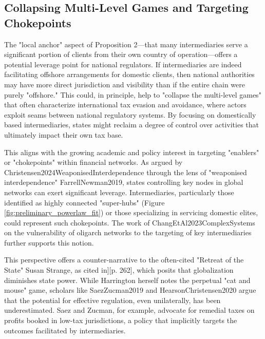 \subsection{Collapsing Multi-Level Games and Targeting Chokepoints}
\label{subsec:collapsing_games_chokepoints}

The "local anchor" aspect of Proposition 2—that many intermediaries serve a significant portion of clients from their own country of operation—offers a potential leverage point for national regulators. If intermediaries are indeed facilitating offshore arrangements for domestic clients, then national authorities may have more direct jurisdiction and visibility than if the entire chain were purely "offshore." This could, in principle, help to "collapse the multi-level games" that often characterize international tax evasion and avoidance, where actors exploit seams between national regulatory systems. By focusing on domestically based intermediaries, states might reclaim a degree of control over activities that ultimately impact their own tax base.

This aligns with the growing academic and policy interest in targeting "enablers" or "chokepoints" within financial networks. As argued by Christensen2024WeaponisedInterdependence through the lens of "weaponised interdependence" FarrellNewman2019, states controlling key nodes in global networks can exert significant leverage. Intermediaries, particularly those identified as highly connected "super-hubs" (Figure \ref{fig:preliminary_powerlaw_fit}) or those specializing in servicing domestic elites, could represent such chokepoints. The work of ChangEtAl2023ComplexSystems on the vulnerability of oligarch networks to the targeting of key intermediaries further supports this notion.

This perspective offers a counter-narrative to the often-cited "Retreat of the State" Susan Strange, as cited in][p. 262], which posits that globalization diminishes state power. While Harrington herself notes the perpetual "cat and mouse" game, scholars like SaezZucman2019 and HearsonChristensen2020 argue that the potential for effective regulation, even unilaterally, has been underestimated. Saez and Zucman, for example, advocate for remedial taxes on profits booked in low-tax jurisdictions, a policy that implicitly targets the outcomes facilitated by intermediaries.

